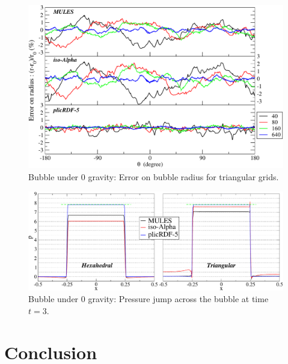 \documentclass[review]{elsarticle}
\begin{document}
\begin{figure}[!h]
  \includegraphics[width=\textwidth]{figures/spuriousCurrents_bubble_error_radius_uns.pdf}
  \caption{Bubble under 0 gravity: Error on bubble radius for triangular grids.}
  \label{fig:spuriousCurrents_bubble_error_radius_uns}
\end{figure}

\begin{figure}[!h]
  \includegraphics[width=\textwidth]{figures/spuriousCurrents_pressure_drop_t=3_160x320.pdf}
  \caption{Bubble under 0 gravity: Pressure jump across the bubble at time $t=3$.}
  \label{fig:spuriousCurrents_pressure_jump}
\end{figure}



\section{\small Conclusion}
\end{document}
